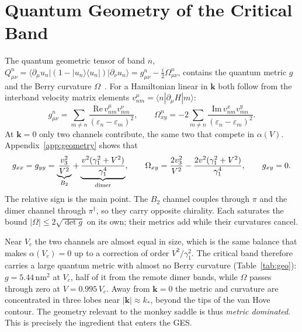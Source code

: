 \documentclass[11pt,a4paper]{article}
\numberwithin{equation}{section}
\newcommand{\bk}{\mathbf{k}}
\newcommand{\nm}{\,\mathrm{nm}}
\begin{document}
\section{Quantum Geometry of the Critical Band}\label{sec:geometry}
The quantum geometric tensor of band $n$, $Q^n_{\mu\nu}=\langle\partial_\mu u_n|(1-|u_n\rangle\langle u_n|)|\partial_\nu u_n\rangle=g^n_{\mu\nu}-\tfrac i2\Omega^n_{\mu\nu}$, contains the quantum metric $g$ and the Berry curvature $\Omega$~\cite{Provost1980}. For a Hamiltonian linear in $\bk$ both follow from the interband velocity matrix elements $v^\mu_{nm}=\langle n|\partial_\mu H|m\rangle$:
\begin{equation}
g^n_{\mu\nu}=\sum_{m\neq n}\frac{\mathrm{Re}\,v^\mu_{nm}v^\nu_{mn}}{(\varepsilon_n-\varepsilon_m)^2},\qquad
\Omega^n_{xy}=-2\sum_{m\neq n}\frac{\mathrm{Im}\,v^x_{nm}v^y_{mn}}{(\varepsilon_n-\varepsilon_m)^2}.
\label{eq:qgt}
\end{equation}
At $\bk=0$ only two channels contribute, the same two that compete in $\alpha(V)$. Appendix~\ref{app:geometry} shows that
\begin{equation}
g_{xx}=g_{yy}=\underbrace{\frac{v_3^2}{V^2}}_{B_2}+\underbrace{\frac{v^2(\gamma_1^2+V^2)}{\gamma_1^4}}_{\rm dimer},\qquad
\Omega_{xy}=\frac{2v_3^2}{V^2}-\frac{2v^2(\gamma_1^2+V^2)}{\gamma_1^4},\qquad g_{xy}=0 .
\label{eq:gOmega}
\end{equation}
The relative sign is the main point. The $B_2$ channel couples through $\pi$ and the dimer channel through $\pi^\dagger$, so they carry opposite chirality. Each saturates the bound $|\Omega|\le2\sqrt{\det g}$ on its own; their metrics add while their curvatures cancel.

Near $V_c$ the two channels are almost equal in size, which is the same balance that makes $\alpha(V_c)=0$ up to a correction of order $V^2/\gamma_1^2$. The critical band therefore carries a large quantum metric with almost no Berry curvature (Table~\ref{tab:geo}): $g=5.44\nm^2$ at $V_c$, half of it from the remote dimer bands, while $\Omega$ passes through zero at $V=0.995\,V_c$. Away from $\bk=0$ the metric and curvature are concentrated in three lobes near $|\bk|\approx k_*$, beyond the tips of the van Hove contour. The geometry relevant to the monkey saddle is thus \emph{metric dominated}. This is precisely the ingredient that enters the GES.
\end{document}

